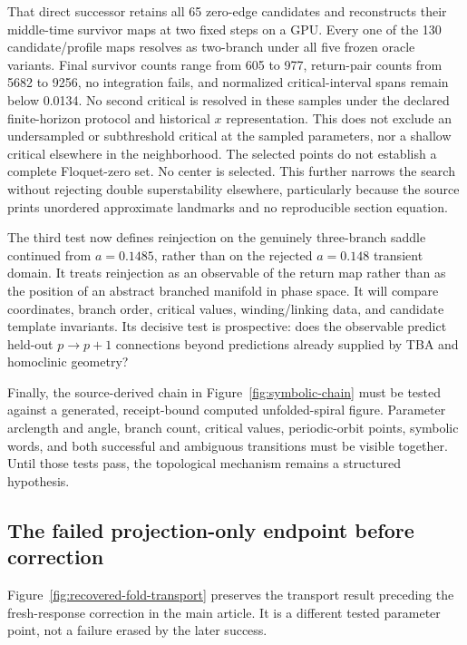 That direct successor retains all 65 zero-edge candidates and reconstructs
their middle-time survivor maps at two fixed steps on a GPU.  Every one of the
130 candidate/profile maps resolves as two-branch under all five frozen oracle
variants.  Final survivor counts range from 605 to 977, return-pair counts from
5682 to 9256, no integration fails, and normalized critical-interval spans
remain below 0.0134. No second critical is resolved in these samples under
the declared finite-horizon protocol and historical $x$ representation.
This does not exclude an undersampled or subthreshold critical at the
sampled parameters, nor a shallow critical elsewhere in the neighborhood.
The selected points do not establish a complete Floquet-zero set.
No center is selected.  This further narrows the search without rejecting
double superstability elsewhere, particularly because the source prints
unordered approximate landmarks and no reproducible section equation.

The third test now defines reinjection on the genuinely three-branch saddle
continued from $a=0.1485$, rather than on the rejected $a=0.148$ transient
domain.  It treats reinjection as an observable of the return map rather
than as the position of an abstract branched manifold in phase space.  It will
compare coordinates, branch order, critical values, winding/linking data, and
candidate template invariants.  Its decisive test is prospective: does the
observable predict held-out $p\mathbin{\to}p+1$ connections beyond predictions
already supplied by TBA and homoclinic geometry?

Finally, the source-derived chain in Figure~\ref{fig:symbolic-chain} must be
tested against a generated, receipt-bound computed unfolded-spiral figure.
Parameter arclength and angle, branch count, critical
values, periodic-orbit points, symbolic words, and both successful and
ambiguous transitions must be visible together.  Until those tests pass, the
topological mechanism remains a structured hypothesis.

\subsection{The failed projection-only endpoint before correction}

Figure~\ref{fig:recovered-fold-transport} preserves the transport result
preceding the fresh-response correction in the main article. It is a
different tested parameter point, not a failure erased by the later success.

